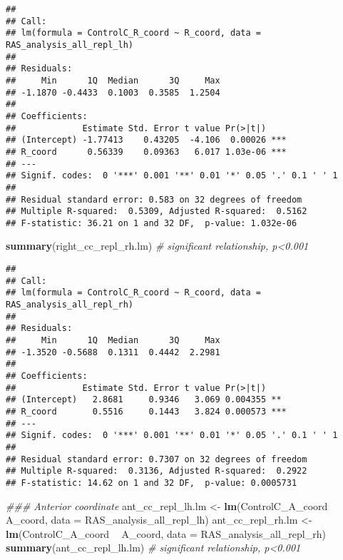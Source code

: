\documentclass[
]{article}
\newenvironment{Shaded}{\begin{snugshade}}{\end{snugshade}}
\newcommand{\CommentTok}[1]{\textcolor[rgb]{0.56,0.35,0.01}{\textit{#1}}}
\newcommand{\DataTypeTok}[1]{\textcolor[rgb]{0.13,0.29,0.53}{#1}}
\newcommand{\KeywordTok}[1]{\textcolor[rgb]{0.13,0.29,0.53}{\textbf{#1}}}
\newcommand{\NormalTok}[1]{#1}
\newcommand{\OperatorTok}[1]{\textcolor[rgb]{0.81,0.36,0.00}{\textbf{#1}}}
\newcommand{\StringTok}[1]{\textcolor[rgb]{0.31,0.60,0.02}{#1}}
\begin{document}
\begin{verbatim}
## 
## Call:
## lm(formula = ControlC_R_coord ~ R_coord, data = RAS_analysis_all_repl_lh)
## 
## Residuals:
##     Min      1Q  Median      3Q     Max 
## -1.1870 -0.4433  0.1003  0.3585  1.2504 
## 
## Coefficients:
##             Estimate Std. Error t value Pr(>|t|)    
## (Intercept) -1.77413    0.43205  -4.106  0.00026 ***
## R_coord      0.56339    0.09363   6.017 1.03e-06 ***
## ---
## Signif. codes:  0 '***' 0.001 '**' 0.01 '*' 0.05 '.' 0.1 ' ' 1
## 
## Residual standard error: 0.583 on 32 degrees of freedom
## Multiple R-squared:  0.5309, Adjusted R-squared:  0.5162 
## F-statistic: 36.21 on 1 and 32 DF,  p-value: 1.032e-06
\end{verbatim}

\begin{Shaded}
\begin{Highlighting}[]
\KeywordTok{summary}\NormalTok{(right_cc_repl_rh.lm) }\CommentTok{# significant relationship, p<0.001}
\end{Highlighting}
\end{Shaded}

\begin{verbatim}
## 
## Call:
## lm(formula = ControlC_R_coord ~ R_coord, data = RAS_analysis_all_repl_rh)
## 
## Residuals:
##     Min      1Q  Median      3Q     Max 
## -1.3520 -0.5688  0.1311  0.4442  2.2981 
## 
## Coefficients:
##             Estimate Std. Error t value Pr(>|t|)    
## (Intercept)   2.8681     0.9346   3.069 0.004355 ** 
## R_coord       0.5516     0.1443   3.824 0.000573 ***
## ---
## Signif. codes:  0 '***' 0.001 '**' 0.01 '*' 0.05 '.' 0.1 ' ' 1
## 
## Residual standard error: 0.7307 on 32 degrees of freedom
## Multiple R-squared:  0.3136, Adjusted R-squared:  0.2922 
## F-statistic: 14.62 on 1 and 32 DF,  p-value: 0.0005731
\end{verbatim}

\begin{Shaded}
\begin{Highlighting}[]
\CommentTok{### Anterior coordinate}
\NormalTok{ant_cc_repl_lh.lm <-}\StringTok{ }\KeywordTok{lm}\NormalTok{(ControlC_A_coord }\OperatorTok{~}\StringTok{ }\NormalTok{A_coord, }\DataTypeTok{data =}\NormalTok{ RAS_analysis_all_repl_lh)}
\NormalTok{ant_cc_repl_rh.lm <-}\StringTok{ }\KeywordTok{lm}\NormalTok{(ControlC_A_coord }\OperatorTok{~}\StringTok{ }\NormalTok{A_coord, }\DataTypeTok{data =}\NormalTok{ RAS_analysis_all_repl_rh)}
\KeywordTok{summary}\NormalTok{(ant_cc_repl_lh.lm) }\CommentTok{# significant relationship, p<0.001}
\end{Highlighting}
\end{Shaded}
\end{document}

